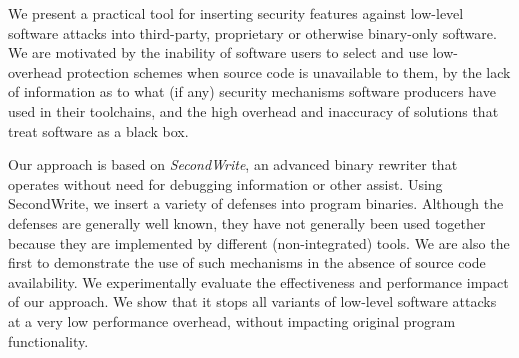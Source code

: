 We present a practical tool for inserting security features against
low-level software attacks into third-party, proprietary or otherwise
binary-only software. We are motivated by the inability of software
users to select and use low-overhead protection schemes when source
code is unavailable to them, by the lack of information as to what (if
any) security mechanisms software producers have used in their
toolchains, and the high overhead and inaccuracy of solutions that
treat software as a black box.

Our approach is based on {\it SecondWrite}, an advanced binary
rewriter that operates without need for debugging information or other
assist. Using SecondWrite, we insert a variety of defenses into
program binaries. Although the defenses are generally well known, they
have not generally been used together because they are implemented by
different (non-integrated) tools. We are also the first to demonstrate
the use of such mechanisms in the absence of source code
availability. We experimentally evaluate the effectiveness and
performance impact of our approach. We show that it stops all variants
of low-level software attacks at a very low performance overhead,
without impacting original program functionality.

